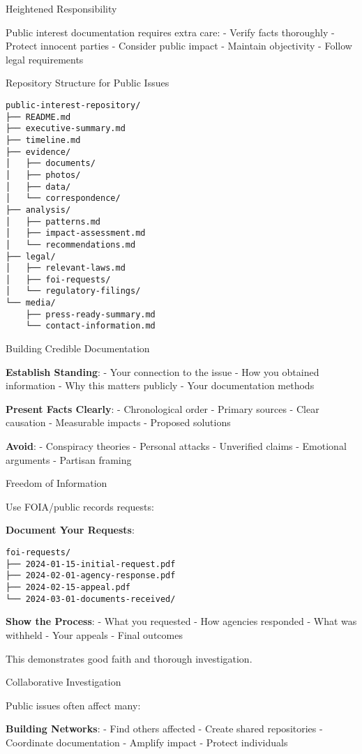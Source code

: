Heightened Responsibility

Public interest documentation requires extra care: - Verify facts
thoroughly - Protect innocent parties - Consider public impact -
Maintain objectivity - Follow legal requirements

Repository Structure for Public Issues

\begin{verbatim}
public-interest-repository/
├── README.md
├── executive-summary.md
├── timeline.md
├── evidence/
│   ├── documents/
│   ├── photos/
│   ├── data/
│   └── correspondence/
├── analysis/
│   ├── patterns.md
│   ├── impact-assessment.md
│   └── recommendations.md
├── legal/
│   ├── relevant-laws.md
│   ├── foi-requests/
│   └── regulatory-filings/
└── media/
    ├── press-ready-summary.md
    └── contact-information.md
\end{verbatim}

Building Credible Documentation

\textbf{Establish Standing}: - Your connection to the issue - How you
obtained information - Why this matters publicly - Your documentation
methods

\textbf{Present Facts Clearly}: - Chronological order - Primary sources
- Clear causation - Measurable impacts - Proposed solutions

\textbf{Avoid}: - Conspiracy theories - Personal attacks - Unverified
claims - Emotional arguments - Partisan framing

Freedom of Information

Use FOIA/public records requests:

\textbf{Document Your Requests}:

\begin{verbatim}
foi-requests/
├── 2024-01-15-initial-request.pdf
├── 2024-02-01-agency-response.pdf
├── 2024-02-15-appeal.pdf
└── 2024-03-01-documents-received/
\end{verbatim}

\textbf{Show the Process}: - What you requested - How agencies responded
- What was withheld - Your appeals - Final outcomes

This demonstrates good faith and thorough investigation.

Collaborative Investigation

Public issues often affect many:

\textbf{Building Networks}: - Find others affected - Create shared
repositories - Coordinate documentation - Amplify impact - Protect
individuals

